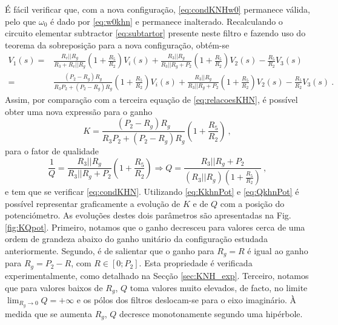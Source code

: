 É fácil verificar que, com a nova configuração, \eqref{eq:condKNHw0} permanece válida, pelo que $\omega_0$ é dado por \eqref{eq:w0khn} e permanece inalterado. Recalculando o circuito elementar subtractor \eqref{eq:subtartor} presente neste filtro e fazendo uso do teorema da sobreposição para a nova configuração, obtém-se
\begin{align*}
        V_1(s) =&\frac{R_v||R_g}{R_3+R_v||R_g}\left(1+\frac{R_5}{R_2}\right) V_i(s) + \frac{R_3||R_g}{R_3||R_g+P_2}\left(1+\frac{R_5}{R_2}\right) V_2(s)  -\frac{R_5}{R_2}V_3(s)\\
=&\frac{(P_2-R_g)R_g}{R_3P_2+(P_2-R_g)R_g}\left(1+\frac{R_5}{R_2}\right) V_i(s) + \frac{R_3||R_g}{R_3||R_g+P_2}\left(1+\frac{R_5}{R_2}\right) V_2(s)  -\frac{R_5}{R_2}V_3(s)\:.
\end{align*}
Assim, por comparação com a terceira equação de \eqref{eq:relacoesKHN}, é possível obter uma nova expressão para o ganho 
\begin{equation}\label{eq:KkhnPot}
    K=\frac{(P_2-R_g)R_g}{R_3P_2+(P_2-R_g)R_g}\left(1+\frac{R_5}{R_2}\right)\:,
\end{equation}
para o fator de qualidade
\begin{equation} \label{eq:QkhnPot}
    \frac{1}{Q}= \frac{R_3||R_g}{R_3||R_g+P_2}\left(1+\frac{R_5}{R_2}\right) \Rightarrow Q = \frac{R_3||R_g+P_2}{(R_3||R_g)\left(1+\frac{R_5}{R_2}\right)}\:,
\end{equation}
e tem que se verificar \eqref{eq:condKHN}. Utilizando \eqref{eq:KkhnPot} e \eqref{eq:QkhnPot} é possível representar graficamente a evolução de $K$ e de $Q$ com a posição do potenciómetro. As evoluções destes dois parâmetros são apresentadas na Fig. \ref{fig:KQpot}. Primeiro, notamos que o ganho decresceu para valores cerca de uma ordem de grandeza abaixo do ganho unitário da configuração estudada anteriormente. Segundo, é de salientar que o ganho para $R_g = R$ é igual ao ganho para $R_g = P_2-R$, com $R \in [0;P_2]$. Esta propriedade é verificada experimentalmente, como detalhado na Secção \ref{sec:KNH_exp}. Terceiro, notamos que para valores baixos de $R_g$, $Q$ toma valores muito elevados, de facto, no limite $\lim_{R_g \rightarrow 0} Q = +\infty$ e os pólos dos filtros deslocam-se para o eixo imaginário. À medida que se aumenta $R_g$, $Q$ decresce monotonamente segundo uma hipérbole.

